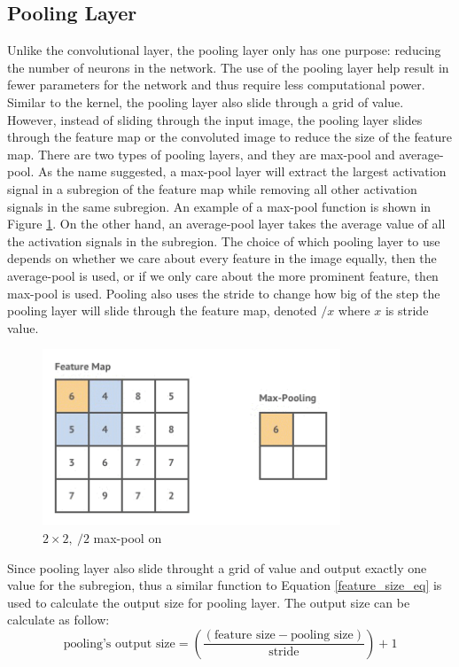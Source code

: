 \subsection{Pooling Layer} \label{subsec:pooling_layer}
Unlike the convolutional layer, the pooling layer only has one purpose: reducing the number of neurons in the network. The use of the pooling layer help result in fewer parameters for the network and thus require less computational power. Similar to the kernel, the pooling layer also slide through a grid of value. However, instead of sliding through the input image, the pooling layer slides through the feature map or the convoluted image to reduce the size of the feature map. There are two types of pooling layers, and they are max-pool and average-pool. As the name suggested, a max-pool layer will extract the largest activation signal in a subregion of the feature map while removing all other activation signals in the same subregion. An example of a max-pool function is shown in Figure \ref{fig:max_pool_diagram}. On the other hand, an average-pool layer takes the average value of all the activation signals in the subregion. The choice of which pooling layer to use depends on whether we care about every feature in the image equally, then the average-pool is used, or if we only care about the more prominent feature, then max-pool is used. Pooling also uses the stride to change how big of the step the pooling layer will slide through the feature map, denoted $/x$ where $x$ is stride value.
%
\begin{figure}[!ht]
    \centering
    \includegraphics[width=3.5in]{figures/max_pool.png}
    \caption{$2 \times 2,\ /2$ max-pool on \cite{zeiler2014visualizing}}
    \label{fig:max_pool_diagram}
\end{figure}
%
Since pooling layer also slide throught a grid of value and output exactly one value for the subregion, thus a similar function to Equation \ref{feature_size_eq} is used to calculate the output size for pooling layer. The output size can be calculate as follow:
\[
    \text{pooling's output size} = \left(\frac{(\text{feature size} - \text{pooling size})}{\text{stride}} \right) + 1
\]

